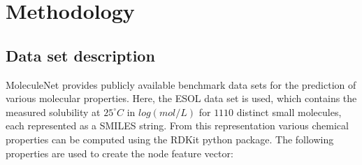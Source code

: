 \chapter{Methodology}


\section{Data set description}


MoleculeNet provides publicly available benchmark data sets for the prediction of 
various molecular properties.\cite{wu2018moleculenet} Here, the ESOL data set is used,
which contains the measured solubility at $25^{\circ} C$ in $log(mol/L)$ for $1110$ 
distinct small molecules, each represented as a SMILES string. 
From this representation various chemical properties can be computed using the RDKit python package\cite{landrum2010r}. 
The following properties are used to create the node feature vector: \cite{wu2023chemistry}

